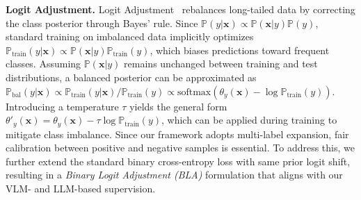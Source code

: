 \noindent \textbf{Logit Adjustment.}
Logit Adjustment~\cite{menon2021longtail} rebalances long-tailed data by correcting the class posterior through Bayes’ rule. 
Since $\mathbb{P}(y|\mathbf{x})\!\propto\!\mathbb{P}(\mathbf{x}|y)\mathbb{P}(y)$, standard training on imbalanced data implicitly optimizes $\mathbb{P}_{\text{train}}(y|\mathbf{x})\!\propto\!\mathbb{P}(\mathbf{x}|y)\mathbb{P}_{\text{train}}(y)$, 
which biases predictions toward frequent classes. 
Assuming $\mathbb{P}(\mathbf{x}|y)$ remains unchanged between training and test distributions, 
a balanced posterior can be approximated as 
$\mathbb{P}_{\text{bal}}(y|\mathbf{x})\!\propto\!\mathbb{P}_{\text{train}}(y|\mathbf{x})/\mathbb{P}_{\text{train}}(y)
\!\propto\!\mathrm{softmax}(\theta_y(\mathbf{x})-\log\mathbb{P}_{\text{train}}(y))$.
Introducing a temperature $\tau$ yields the general form 
$\theta'_y(\mathbf{x})=\theta_y(\mathbf{x})-\tau\log\mathbb{P}_{\text{train}}(y)$, 
which can be applied during training to mitigate class imbalance. 
Since our framework adopts multi-label expansion, fair calibration between positive and negative samples is essential. 
To address this, we further extend the standard binary cross-entropy loss with same prior logit shift, 
resulting in a \emph{Binary Logit Adjustment (BLA)} formulation that aligns with our VLM- and LLM-based supervision. 











